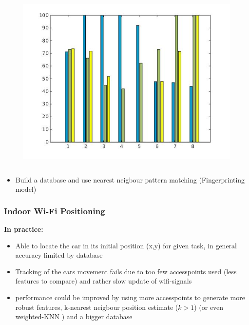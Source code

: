 \documentclass[noshadow]{LSRslides}
\begin{document}
\begin{frame}
\begin{columns}
	\vspace*{-4mm}
	\begin{figure}
      \includegraphics[scale=0.25,left]{DatabaseBarDiagramNoTitle.jpg} 
   \end{figure}
   \end{columns}
   
   \begin{itemize}
	\item Build a database and use nearest neigbour pattern matching (Fingerprinting model)
\end{itemize}
		
\end{frame}

\begin{frame}
\frametitle{Indoor Wi-Fi Positioning}
\textbf{In practice: }
 \begin{itemize}
	\item Able to locate the car in its initial position (x,y) for given task, in general accuracy limited by database
	\item Tracking of the cars movement fails due to too few accesspoints used (less features to compare) and rather slow update of wifi-signals  
	\item performance could be improved by using more accesspoints to generate more robust features, k-nearest neigbour position estimate ($k>1$) (or even weighted-KNN \cite{shin12}) and a bigger database
\end{itemize}

\end{frame}
\end{document}
